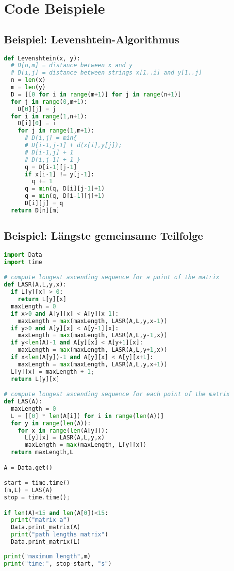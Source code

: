 \section{Code Beispiele}

\subsection{Beispiel: Levenshtein-Algorithmus}
\begin{lstlisting}[language=Python]
def Levenshtein(x, y):
  # D[n,m] = distance between x and y
  # D[i,j] = distance between strings x[1..i] and y[1..j]
  n = len(x)
  m = len(y)
  D = [[0 for i in range(m+1)] for j in range(n+1)]
  for j in range(0,m+1):
    D[0][j] = j
  for i in range(1,n+1):
    D[i][0] = i
    for j in range(1,m+1):
      # D[i,j] = min{ 
      # D[i-1,j-1] + d(x[i],y[j]);
      # D[i-1,j] + 1
      # D[i,j-1] + 1 }
      q = D[i-1][j-1] 
      if x[i-1] != y[j-1]:
        q += 1
      q = min(q, D[i][j-1]+1)
      q = min(q, D[i-1][j]+1)
      D[i][j] = q
  return D[n][m]
\end{lstlisting}

\subsection{Beispiel: Längste gemeinsame Teilfolge}
\begin{lstlisting}[language=Python]
import Data
import time

# compute longest ascending sequence for a point of the matrix
def LASR(A,L,y,x):
  if L[y][x] > 0:
    return L[y][x]
  maxLength = 0
  if x>0 and A[y][x] < A[y][x-1]: 
    maxLength = max(maxLength, LASR(A,L,y,x-1))
  if y>0 and A[y][x] < A[y-1][x]: 
    maxLength = max(maxLength, LASR(A,L,y-1,x))
  if y<len(A)-1 and A[y][x] < A[y+1][x]: 
    maxLength = max(maxLength, LASR(A,L,y+1,x))
  if x<len(A[y])-1 and A[y][x] < A[y][x+1]: 
    maxLength = max(maxLength, LASR(A,L,y,x+1))
  L[y][x] = maxLength + 1;
  return L[y][x]

# compute longest ascending sequence for each point of the matrix
def LAS(A):
  maxLength = 0
  L = [[0] * len(A[i]) for i in range(len(A))]
  for y in range(len(A)):
    for x in range(len(A[y])):
      L[y][x] = LASR(A,L,y,x)
      maxLength = max(maxLength, L[y][x])
  return maxLength,L

A = Data.get()

start = time.time()
(m,L) = LAS(A)
stop = time.time();

if len(A)<15 and len(A[0])<15:
  print("matrix a")
  Data.print_matrix(A)
  print("path lengths matrix")
  Data.print_matrix(L)
  
print("maximum length",m)
print("time:", stop-start, "s")
\end{lstlisting}\vspace{-6px}

